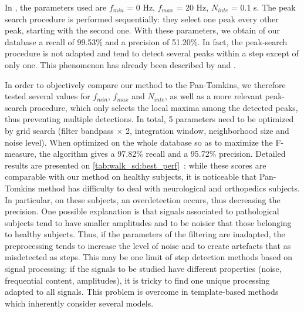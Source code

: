 \documentclass[../thesis.tex]{subfiles}
\begin{document}
In \citet{ying2007automatic}, the parameters used are $f_{min}$ = 0 Hz, $f_{max}$ = 20 Hz, $N_{inte}$ = 0.1 s. The peak search procedure is performed sequentially: they select one peak every other peak, starting with the second one. With these parameters, we obtain of our database a recall of 99.53\% and a precision of 51.20\%. In fact, the peak-search procedure is not adapted and tend to detect several peaks within a step except of only one. This phenomenon has already been described by \citet{libby2012simple} and \citet{thuer2008step}.

In order to objectively compare our method to the Pan-Tomkins, we therefore tested several values for  $f_{min}$, $f_{max}$ and $N_{inte}$, as well as a more relevant peak-search procedure, which only selects the local maxima among the detected peaks, thus preventing multiple detections. In total, 5 parameters need to be optimized by grid search (filter bandpass $\times$ 2, integration window, neighborhood size and noise level). When optimized on the whole database so as to maximize the F-measure, the algorithm gives a  97.82\% recall and a 95.72\% precision.  Detailed results are presented on \autoref{tab:walk_sd:best_perf}~: while these scores are comparable with our method on healthy subjects, it is noticeable that Pan-Tomkins method has difficulty to deal with neurological and orthopedics subjects. In particular, on these subjects, an overdetection occurs, thus decreasing the precision. One possible explanation is that signals associated to pathological subjects tend to have smaller amplitudes and to be noisier 
that those belonging to healthy subjects. Thus, if the parameters of the filtering are inadapted, the preprocessing tends to increase the level of noise and to create artefacts that as misdetected as steps. This may be one limit of step detection methods based on signal processing: if the signals to be studied have different properties (noise, frequential content, amplitudes), it is tricky to find one unique processing adapted to all signals. This problem is overcome in template-based methods which inherently consider several models.



% 
% 
\end{document}
